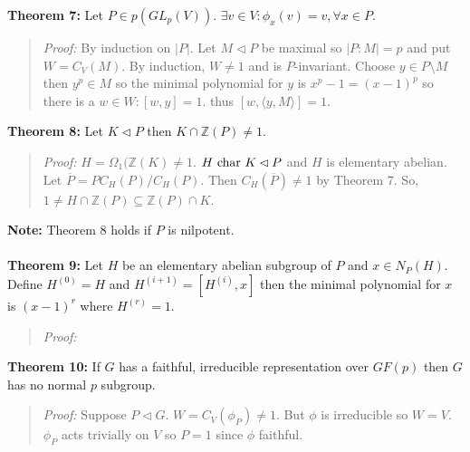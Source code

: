 {\bf Theorem 7:} Let $P \in p(GL_p(V))$.  $\exists v \in V: \phi_{x}(v)= v, \forall x \in P$.
\begin{quote}
\emph{Proof:}
By induction on $|P|$.  Let $M \lhd P$ be maximal so $|P:M|=p$ and put $W=C_V(M)$.
By induction, $W \ne 1$ and is $P$-invariant.  Choose $y \in P \setminus M$ then
$y^p \in M$ so the minimal polynomial for $y$ is $x^p-1 = (x-1)^p$ so there is a $w \in W: [w,y]=1$.
thus $[w, \langle y, M \rangle ] = 1$.
\end{quote}
{\bf Theorem 8:} Let $K \lhd P$ then $K \cap {\mathbb Z}(P) \ne 1$.
\begin{quote}
\emph{Proof:}
$H= \Omega_1({\mathbb Z}(K) \ne 1$.  $H \textnormal{ char } K \lhd P$ and $H$ is elementary
abelian. Let ${\overline P} = P C_H(P) / C_H(P)$.  Then $C_H({\overline P}) \ne 1$ by Theorem 7.
So, $1 \ne H \cap {\mathbb Z}(P) \subseteq {\mathbb Z}(P) \cap K$.
\end{quote}
{\bf Note:} Theorem 8 holds if $P$ is nilpotent.
\\
\\
{\bf Theorem 9:}  Let $H$ be an elementary abelian subgroup of $P$ and $x \in N_P(H)$.  Define
$H^{(0)} = H$ and $H^{(i+1)}= [H^{(i)}, x]$ then the minimal polynomial for $x$ is $(x-1)^r$
where $H^{(r)}=1$.
\begin{quote}
\emph{Proof:}
\end{quote}
{\bf Theorem 10:} If $G$ has a faithful, irreducible representation over $GF(p)$ then $G$
has no normal $p$ subgroup.
\begin{quote}
\emph{Proof:}
Suppose $P \lhd G$.  $W= C_V(\phi_{P}) \ne 1$.  But $\phi$ is irreducible so $W=V$.  $\phi_{P}$
acts trivially on $V$ so $P=1$ since $\phi$ faithful.
\end{quote}

